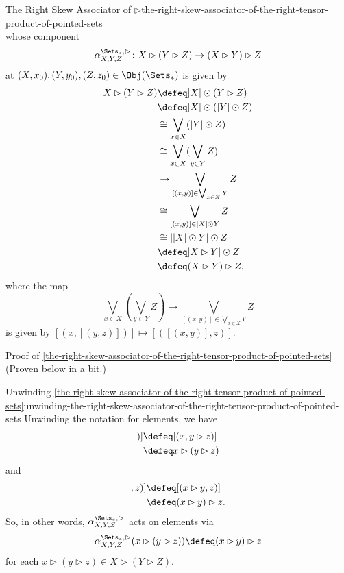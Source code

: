 \begin{definition}{The Right Skew Associator of $\rhd$}{the-right-skew-associator-of-the-right-tensor-product-of-pointed-sets}
\[    \]%
    whose component
    \[
        \alpha^{\Sets_{*},\rhd}_{X,Y,Z}
        \colon
        X\rhd(Y\rhd Z)
        \to
        (X\rhd Y)\rhd Z
    \]%
    at $(X,x_{0}),(Y,y_{0}),(Z,z_{0})\in\Obj(\Sets_{*})$ is given by
    \begin{align*}
        X\rhd(Y\rhd Z) &\defeq |X|\odot(Y\rhd Z)\\
                       &\defeq |X|\odot(|Y|\odot Z)\\
                       &\cong  \bigvee_{x\in X}(|Y|\odot Z)\\
                       &\cong  \bigvee_{x\in X}(\bigvee_{y\in Y}Z)\\
                       &\to    \bigvee_{[(x,y)]\in\bigvee_{x\in X}Y}Z\\
                       &\cong  \bigvee_{[(x,y)]\in|X|\odot Y}Z\\%
                       &\cong  ||X|\odot Y|\odot Z\\%
                       &\defeq |X\rhd Y|\odot Z\\%
                       &\defeq (X\rhd Y)\rhd Z,%
    \end{align*}
    where the map%
    \[
        \bigvee_{x\in X}(\bigvee_{y\in Y}Z)%
        \to%
        \bigvee_{[(x,y)]\in\bigvee_{x\in X}Y}Z%
    \]%
    is given by $[(x,[(y,z)])]\mapsto[([(x,y)],z)]$.
\end{definition}
\begin{Proof}{Proof of \cref{the-right-skew-associator-of-the-right-tensor-product-of-pointed-sets}}%
    (Proven below in a bit.)
\end{Proof}
\begin{remark}{Unwinding \cref{the-right-skew-associator-of-the-right-tensor-product-of-pointed-sets}}{unwinding-the-right-skew-associator-of-the-right-tensor-product-of-pointed-sets}%
    Unwinding the notation for elements, we have
    \begin{align*}
        [(x,[(y,z)])] &\defeq [(x,y\rhd z)]\\
                      &\defeq x\rhd(y\rhd z)
    \end{align*}
    and
    \begin{align*}
        [([(x,y)],z)] &\defeq [(x\rhd y,z)]\\
                      &\defeq (x\rhd y)\rhd z.
    \end{align*}
    So, in other words, $\alpha^{\Sets_{*},\rhd}_{X,Y,Z}$ acts on elements via
    \[
        \alpha^{\Sets_{*},\rhd}_{X,Y,Z}(x\rhd(y\rhd z))
        \defeq
        (x\rhd y)\rhd z
    \]%
    for each $x\rhd(y\rhd z)\in X\rhd(Y\rhd Z)$.
\end{remark}
